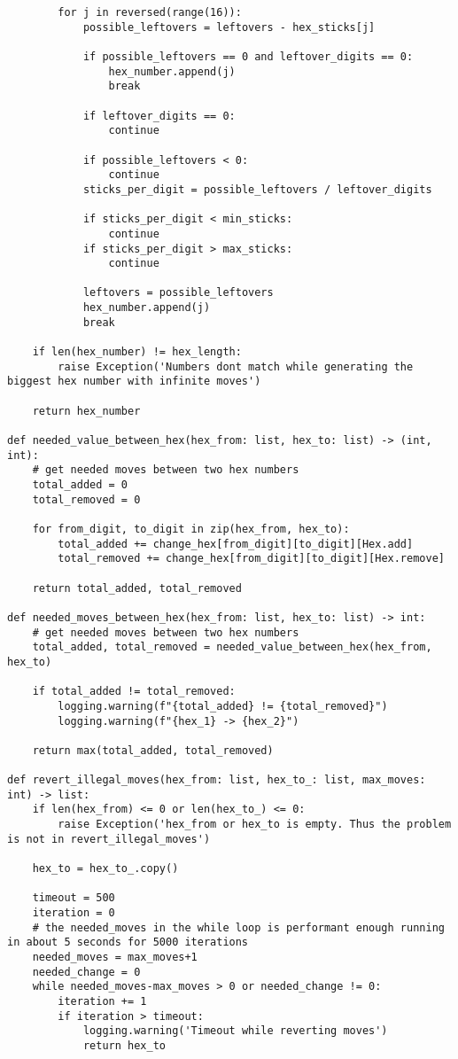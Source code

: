 \documentclass[a4paper,10pt,ngerman]{scrartcl}
\begin{document}
\begin{lstlisting}
        for j in reversed(range(16)):
            possible_leftovers = leftovers - hex_sticks[j]

            if possible_leftovers == 0 and leftover_digits == 0:
                hex_number.append(j)
                break

            if leftover_digits == 0:
                continue

            if possible_leftovers < 0:
                continue
            sticks_per_digit = possible_leftovers / leftover_digits

            if sticks_per_digit < min_sticks:
                continue
            if sticks_per_digit > max_sticks:
                continue

            leftovers = possible_leftovers
            hex_number.append(j)
            break

    if len(hex_number) != hex_length:
        raise Exception('Numbers dont match while generating the biggest hex number with infinite moves')

    return hex_number

def needed_value_between_hex(hex_from: list, hex_to: list) -> (int, int):
    # get needed moves between two hex numbers
    total_added = 0
    total_removed = 0

    for from_digit, to_digit in zip(hex_from, hex_to):
        total_added += change_hex[from_digit][to_digit][Hex.add]
        total_removed += change_hex[from_digit][to_digit][Hex.remove]

    return total_added, total_removed

def needed_moves_between_hex(hex_from: list, hex_to: list) -> int:
    # get needed moves between two hex numbers
    total_added, total_removed = needed_value_between_hex(hex_from, hex_to)

    if total_added != total_removed:
        logging.warning(f"{total_added} != {total_removed}")
        logging.warning(f"{hex_1} -> {hex_2}")

    return max(total_added, total_removed)

def revert_illegal_moves(hex_from: list, hex_to_: list, max_moves: int) -> list:
    if len(hex_from) <= 0 or len(hex_to_) <= 0:
        raise Exception('hex_from or hex_to is empty. Thus the problem is not in revert_illegal_moves')

    hex_to = hex_to_.copy()

    timeout = 500
    iteration = 0
    # the needed_moves in the while loop is performant enough running in about 5 seconds for 5000 iterations
    needed_moves = max_moves+1
    needed_change = 0
    while needed_moves-max_moves > 0 or needed_change != 0:
        iteration += 1
        if iteration > timeout:
            logging.warning('Timeout while reverting moves')
            return hex_to



\end{lstlisting}
\end{document}
